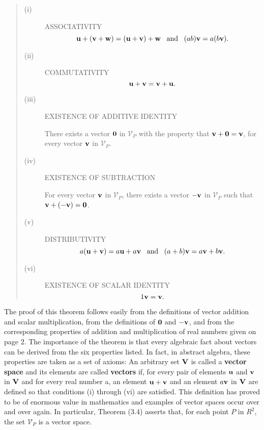 \begin{quote}

\begin{description}
\item[(i)] ASSOCIATIVITY 
$$
\mbox{\bf{u}} + (\mbox{\bf{v}} + \mbox{\bf{w}}) = (\mbox{\bf{u}} + \mbox{\bf{v}}) + \mbox{\bf{w}}\;\;\; \mbox{and}\;\;\; (ab)\mbox{\bf{v}} = a(b\mbox{\bf{v}}). 
$$


\item[(ii)] COMMUTATIVITY 
$$
\mbox{\bf{u}} + \mbox{\bf{v}} = \mbox{\bf{v}} + \mbox{\bf{u}}.
$$

\item[(iii)] EXISTENCE OF ADDITIVE IDENTITY


There exists a vector $\mbox{\bf{0}}$ in $\mathcal{V}_P$ with the property that $\mbox{\bf{v}} + \mbox{\bf{0}} = \mbox{\bf{v}}$, for every vector $\mbox{\bf{v}}$ in $\mathcal{V}_P$.


\item[(iv)] EXISTENCE OF SUBTRACTION

For every vector $\mbox{\bf{v}}$ in $\mathcal{V}_P$, there exists a vector $-\mbox{\bf{v}}$ in $\mathcal{V}_P$ such that $\mbox{\bf{v}} + (-\mbox{\bf{v}}) = \mbox{\bf{0}}$.


\item[(v)] DISTRIBUTIVITY 
$$
a(\mbox{\bf{u}} + \mbox{\bf{v}}) = a\mbox{\bf{u}} + a\mbox{\bf{v}} \;\;\;\mbox{and}\;\;\;  (a + b)\mbox{\bf{v}} = a\mbox{\bf{v}} + b\mbox{\bf{v}}.
$$

\item[(vi)] EXISTENCE OF SCALAR IDENTITY 
$$
1\mbox{\bf{v}} = \mbox{\bf{v}}.
$$
\end{description}
\end{quote}

The proof of this theorem follows easily from the definitions of vector addition and scalar multiplication, from the definitions of $\mbox{\bf{0}}$ and $-\mbox{\bf{v}}$, and from the corresponding properties of addition and multiplication of real
numbers given on page 2. The importance of the theorem is that every algebraic fact about vectors can be derived from the six properties listed. In fact, in abstract algebra, these properties are taken as a set of axioms: An arbitrary set $\mbox{\bf{V}}$ is called a \textbf{vector space} and its elements are called \textbf{vectors} if, for every pair of elements $\mbox{\bf{u}}$ and $\mbox{\bf{v}}$ in $\mbox{\bf{V}}$ and for every real number a, an element $\mbox{\bf{u}} + \mbox{\bf{v}}$ and an element $a\mbox{\bf{v}}$ in $\mbox{\bf{V}}$ are defined so that conditions (i) through (vi) are satisfied. This definition has proved to be of enormous value in mathematics and examples of vector spaces occur over and over again. In particular, Theorem (3.4) asserts that, for each point $P$ in $R^2$, the set $\mathcal{V}_P$ is a vector space.
\medskip

